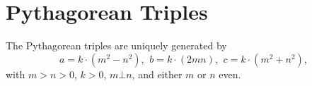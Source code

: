 	
\section{Pythagorean Triples}
	 The Pythagorean triples are uniquely generated by
	 \[ a=k\cdot (m^{2}-n^{2}),\ \,b=k\cdot (2mn),\ \,c=k\cdot (m^{2}+n^{2}), \]
	 with $m > n > 0$, $k > 0$, $m \bot n$, and either $m$ or $n$ even.